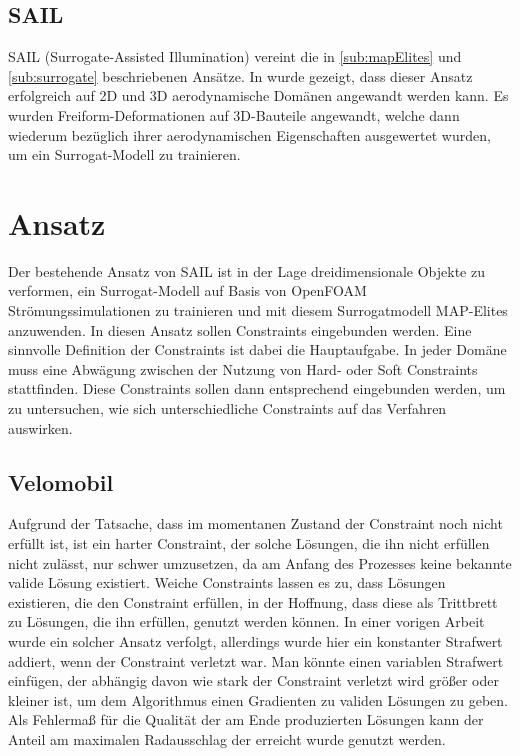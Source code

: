 \documentclass[12pt]{article}
\begin{document}
\subsection{SAIL}

SAIL (Surrogate-Assisted Illumination) vereint die in \ref{sub:mapElites} und \ref{sub:surrogate} beschriebenen Ansätze.
In \cite{Gaier.6152018} wurde gezeigt, dass dieser Ansatz erfolgreich auf 2D und 3D aerodynamische Domänen angewandt werden kann.
Es wurden Freiform-Deformationen auf 3D-Bauteile angewandt, welche dann wiederum bezüglich ihrer aerodynamischen Eigenschaften ausgewertet wurden, um ein Surrogat-Modell zu trainieren.
\section{Ansatz}

Der bestehende Ansatz von SAIL ist in der Lage dreidimensionale Objekte zu verformen, ein Surrogat-Modell auf Basis von OpenFOAM \cite{OpenCFD.} Strömungssimulationen zu trainieren und mit diesem Surrogatmodell MAP-Elites anzuwenden.
In diesen Ansatz sollen Constraints eingebunden werden.
Eine sinnvolle Definition der Constraints ist dabei die Hauptaufgabe.
In jeder Domäne muss eine Abwägung zwischen der Nutzung von Hard- oder Soft Constraints stattfinden.
Diese Constraints sollen dann entsprechend eingebunden werden, um zu untersuchen, wie sich unterschiedliche Constraints auf das Verfahren auswirken.

\subsection{Velomobil}
Aufgrund der Tatsache, dass im momentanen Zustand der Constraint noch nicht erfüllt ist, ist ein harter Constraint, der solche Lösungen, die ihn nicht erfüllen nicht zulässt, nur schwer umzusetzen, da am Anfang des Prozesses keine bekannte valide Lösung existiert.
Weiche Constraints lassen es zu, dass Lösungen existieren, die den Constraint erfüllen, in der Hoffnung, dass diese als Trittbrett zu Lösungen, die ihn erfüllen, genutzt werden können.
In einer vorigen Arbeit wurde ein solcher Ansatz verfolgt, allerdings wurde hier ein konstanter Strafwert addiert, wenn der Constraint verletzt war.
Man könnte einen variablen Strafwert einfügen, der abhängig davon wie stark der Constraint verletzt wird  größer oder kleiner ist, um dem Algorithmus einen Gradienten zu validen Lösungen zu geben.
Als Fehlermaß für die Qualität der am Ende produzierten Lösungen kann der Anteil am maximalen Radausschlag der erreicht wurde genutzt werden.
\end{document}
